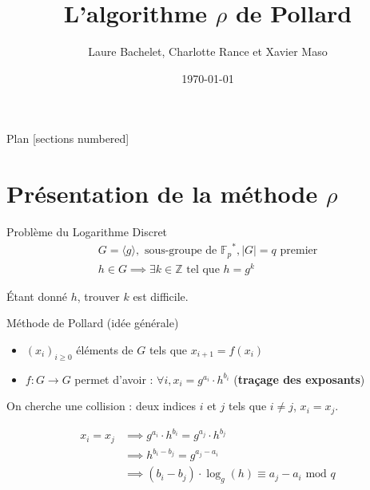 \documentclass{beamer}
\title{L'algorithme $\rho$ de Pollard}
\date{\today}
\author{Laure Bachelet, Charlotte Rance et Xavier Maso}
\institute{Master CSI, Université de Bordeaux}
\begin{document}
  \maketitle

  \begin{frame}{Plan}
    [sections numbered]
    \tableofcontents[hideallsubsections]
  \end{frame}


  \section{Présentation de la méthode $\rho$}

  \begin{frame}{Problème du Logarithme Discret}
    \begin{align*}
      G = \langle g \rangle, \text{\ sous-groupe de }{\mathbb{F}_p}^*, |G| = q \text{\ premier} \\
      h \in G \implies \exists k \in \mathbb{Z} \text{\ tel que } h = g^k
    \end{align*}

    \bigskip
    Étant donné $h$, trouver $k$ est difficile.
  \end{frame}


  \begin{frame}{Méthode de Pollard (idée générale)}
    \begin{itemize}
      \item $(x_i)_{i \ge 0}$ éléments de $G$ tels que $x_{i+1} = f(x_i)$
      \item $f: G \rightarrow G$ permet d'avoir : $\forall i, x_i = g^{a_i} \cdot h^{b_i}$ (\textbf{traçage des exposants})
    \end{itemize}


    On cherche une collision : deux indices $i$ et $j$ tels que $i \ne j$, $x_i = x_j$.

    \begin{align*}
      x_i = x_j &\implies g^{a_i} \cdot h^{b_i} = g^{a_j} \cdot h^{b_j} \\
                &\implies h^{b_i - b_j} = g^{a_j - a_i} \\
                &\implies (b_i - b_j) \cdot \log_g(h) \equiv a_j - a_i \text{\ mod } q
    \end{align*}
  \end{frame}
\end{document}
